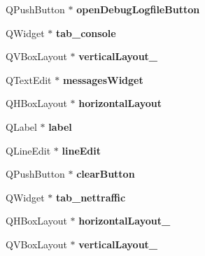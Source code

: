 \begin{DoxyCompactItemize}
Q\+Push\+Button $\ast$ {\bfseries open\+Debug\+Logfile\+Button}
\item 
\mbox{\label{class_ui___r_p_c_console_a261e81d535f030aeeabf7c1a6f776020}} 
Q\+Widget $\ast$ {\bfseries tab\+\_\+console}
\item 
\mbox{\label{class_ui___r_p_c_console_a659aa80cdd8e0dd52a93646309222585}} 
Q\+V\+Box\+Layout $\ast$ {\bfseries vertical\+Layout\+\_}
\item 
\mbox{\label{class_ui___r_p_c_console_aea91adc2e8b756e9f4777be05734a241}} 
Q\+Text\+Edit $\ast$ {\bfseries messages\+Widget}
\item 
\mbox{\label{class_ui___r_p_c_console_a694a01390286320262a72f932cf9b856}} 
Q\+H\+Box\+Layout $\ast$ {\bfseries horizontal\+Layout}
\item 
\mbox{\label{class_ui___r_p_c_console_a55e9911d7d09cb2750d000d19faa8a21}} 
Q\+Label $\ast$ {\bfseries label}
\item 
\mbox{\label{class_ui___r_p_c_console_a868f3152364df8f2b1951f56b2e076af}} 
Q\+Line\+Edit $\ast$ {\bfseries line\+Edit}
\item 
\mbox{\label{class_ui___r_p_c_console_a3f76504c6e157f30027c9a33de36a104}} 
Q\+Push\+Button $\ast$ {\bfseries clear\+Button}
\item 
\mbox{\label{class_ui___r_p_c_console_aa4aec3fc53dec948084dd5598550a2c6}} 
Q\+Widget $\ast$ {\bfseries tab\+\_\+nettraffic}
\item 
\mbox{\label{class_ui___r_p_c_console_ac9253c054f59c847379a36d009da3145}} 
Q\+H\+Box\+Layout $\ast$ {\bfseries horizontal\+Layout\+\_}
\item 
\mbox{\label{class_ui___r_p_c_console_a032c4ecda376d565ea8039acf6ebfea3}} 
Q\+V\+Box\+Layout $\ast$ {\bfseries vertical\+Layout\+\_}
\item 
\mbox{\label{class_ui___r_p_c_console_a281d5fdfcb94bc43795059d0f33815d6}} 

\end{DoxyCompactItemize}
